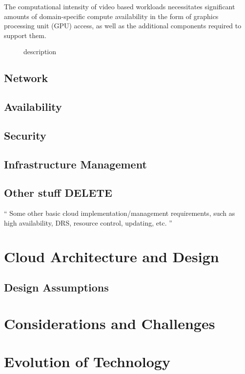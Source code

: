 \documentclass[]{article}
\begin{document}
The computational intensity of video based workloads necessitates significant amounts of domain-specific compute availability in the form of graphics processing unit (GPU) access, as well as the additional components required to support them. 

\begin{description}
    \item[] description
\end{description}

\subsection{Network}

\subsection{Availability}

\subsection{Security}

\subsection{Infrastructure Management}

\subsection{Other stuff DELETE}
`` Some other basic cloud implementation/management requirements, such as high availability, DRS,
resource control, updating, etc. ''

\section{Cloud Architecture and Design}

\subsection{Design Assumptions}

\section{Considerations and Challenges}

\section{Evolution of Technology}
\end{document}

